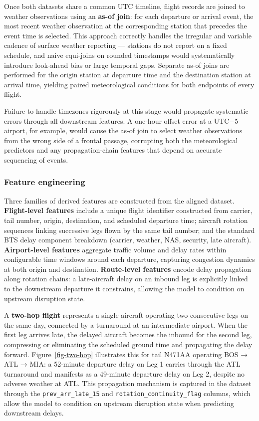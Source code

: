 \documentclass[
  letterpaper,
  DIV=11,
  numbers=noendperiod]{scrartcl}
\begin{document}
Once both datasets share a common UTC timeline, flight records are
joined to weather observations using an \textbf{as-of join}: for each
departure or arrival event, the most recent weather observation at the
corresponding station that precedes the event time is selected. This
approach correctly handles the irregular and variable cadence of surface
weather reporting --- stations do not report on a fixed schedule, and
naive equi-joins on rounded timestamps would systematically introduce
look-ahead bias or large temporal gaps. Separate as-of joins are
performed for the origin station at departure time and the destination
station at arrival time, yielding paired meteorological conditions for
both endpoints of every flight.

Failure to handle timezones rigorously at this stage would propagate
systematic errors through all downstream features. A one-hour offset
error at a UTC−5 airport, for example, would cause the as-of join to
select weather observations from the wrong side of a frontal passage,
corrupting both the meteorological predictors and any propagation-chain
features that depend on accurate sequencing of events.

\subsubsection{Feature engineering}\label{feature-engineering}

Three families of derived features are constructed from the aligned
dataset. \textbf{Flight-level features} include a unique flight
identifier constructed from carrier, tail number, origin, destination,
and scheduled departure time; aircraft rotation sequences linking
successive legs flown by the same tail number; and the standard BTS
delay component breakdown (carrier, weather, NAS, security, late
aircraft). \textbf{Airport-level features} aggregate traffic volume and
delay rates within configurable time windows around each departure,
capturing congestion dynamics at both origin and destination.
\textbf{Route-level features} encode delay propagation along rotation
chains: a late-aircraft delay on an inbound leg is explicitly linked to
the downstream departure it constrains, allowing the model to condition
on upstream disruption state.

A \textbf{two-hop flight} represents a single aircraft operating two
consecutive legs on the same day, connected by a turnaround at an
intermediate airport. When the first leg arrives late, the delayed
aircraft becomes the inbound for the second leg, compressing or
eliminating the scheduled ground time and propagating the delay forward.
Figure~\ref{fig-two-hop} illustrates this for tail N471AA operating BOS
→ ATL → MIA: a 52-minute departure delay on Leg 1 carries through the
ATL turnaround and manifests as a 49-minute departure delay on Leg 2,
despite no adverse weather at ATL. This propagation mechanism is
captured in the dataset through the \texttt{prev\_arr\_late\_15} and
\texttt{rotation\_continuity\_flag} columns, which allow the model to
condition on upstream disruption state when predicting downstream
delays.
\end{document}
